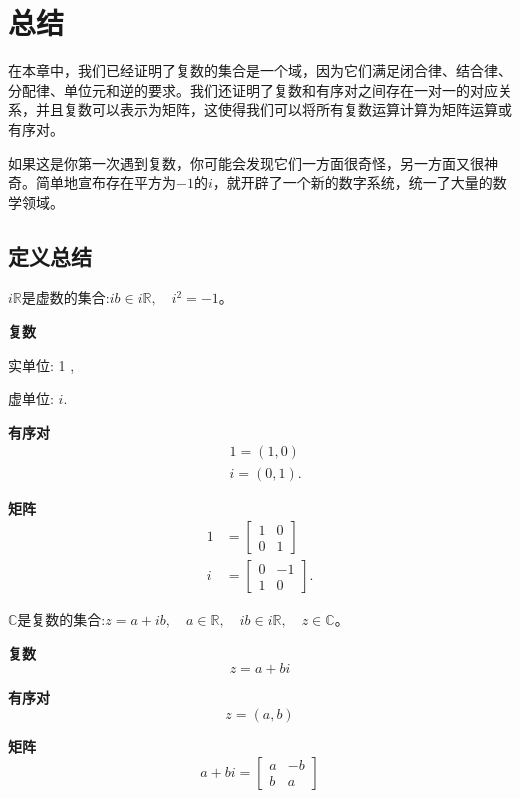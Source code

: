 \section{总结}
在本章中，我们已经证明了复数的集合是一个域，因为它们满足闭合律、结合律、分配律、单位元和逆的要求。我们还证明了复数和有序对之间存在一对一的对应关系，并且复数可以表示为矩阵，这使得我们可以将所有复数运算计算为矩阵运算或有序对。

如果这是你第一次遇到复数，你可能会发现它们一方面很奇怪，另一方面又很神奇。简单地宣布存在平方为$-1$的$i$，就开辟了一个新的数字系统，统一了大量的数学领域。

\subsection{定义总结}
\begin{tcolorbox}[breakable, enhanced,title = {定义}]
  $i \mathbb{R}$是虚数的集合:$i b \in i \mathbb{R}, \quad i^{2}=-1$。

  \textbf{复数}

  实单位: 1 ,

  虚单位: $i$.

  \textbf{有序对}
  $$
    \begin{aligned}
       & 1=(1,0)   \\
       & i=(0,1) .
    \end{aligned}
  $$

  \textbf{矩阵}
  $$
    \begin{aligned}
      1 & =\left[\begin{array}{ll}
          1 & 0 \\
          0 & 1
        \end{array}\right]   \\
      i & =\left[\begin{array}{cc}
          0 & -1 \\
          1 & 0
        \end{array}\right] .
    \end{aligned}
  $$
\end{tcolorbox}

\begin{tcolorbox}[breakable, enhanced,title = {表示}]

  $\mathbb{C}$是复数的集合:$z=a+i b, \quad a \in \mathbb{R}, \quad i b \in i \mathbb{R}, \quad z \in \mathbb{C}$。

  \textbf{复数}
  $$
    z=a+b i
  $$

  \textbf{有序对}
  $$
    z=(a, b)
  $$

  \textbf{矩阵}
  $$
    a+b i=\left[\begin{array}{cc}
        a & -b \\
        b & a
      \end{array}\right]
  $$
\end{tcolorbox}

